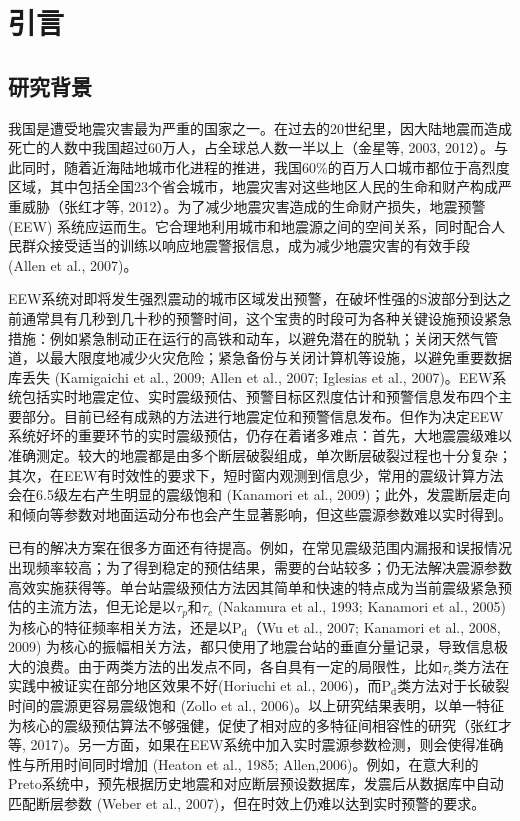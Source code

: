 
\chapter{引言}
\section{研究背景}
\indent 我国是遭受地震灾害最为严重的国家之一。在过去的20世纪里，因大陆地震而造成死亡的人数中我国超过60万人，占全球总人数一半以上（金星等, 2003, 2012）。与此同时，随着近海陆地城市化进程的推进，我国60\%的百万人口城市都位于高烈度区域，其中包括全国23个省会城市，地震灾害对这些地区人民的生命和财产构成严重威胁（张红才等, 2012）。为了减少地震灾害造成的生命财产损失，地震预警 (EEW) 系统应运而生。它合理地利用城市和地震源之间的空间关系，同时配合人民群众接受适当的训练以响应地震警报信息，成为减少地震灾害的有效手段 (Allen et al., 2007)。


 \indent EEW系统对即将发生强烈震动的城市区域发出预警，在破坏性强的S波部分到达之前通常具有几秒到几十秒的预警时间，这个宝贵的时段可为各种关键设施预设紧急措施：例如紧急制动正在运行的高铁和动车，以避免潜在的脱轨；关闭天然气管道，以最大限度地减少火灾危险；紧急备份与关闭计算机等设施，以避免重要数据库丢失 (Kamigaichi et al., 2009; Allen et al., 2007; Iglesias et al., 2007)。EEW系统包括实时地震定位、实时震级预估、预警目标区烈度估计和预警信息发布四个主要部分。目前已经有成熟的方法进行地震定位和预警信息发布。但作为决定EEW系统好坏的重要环节的实时震级预估，仍存在着诸多难点：首先，大地震震级难以准确测定。较大的地震都是由多个断层破裂组成，单次断层破裂过程也十分复杂；其次，在EEW有时效性的要求下，短时窗内观测到信息少，常用的震级计算方法会在6.5级左右产生明显的震级饱和 (Kanamori et al., 2009)；此外，发震断层走向和倾向等参数对地面运动分布也会产生显著影响，但这些震源参数难以实时得到。
 
 \indent 已有的解决方案在很多方面还有待提高。例如，在常见震级范围内漏报和误报情况出现频率较高；为了得到稳定的预估结果，需要的台站较多；仍无法解决震源参数高效实施获得等。单台站震级预估方法因其简单和快速的特点成为当前震级紧急预估的主流方法，但无论是以$\tau_{p}$和$\tau_{c}$ (Nakamura et al., 1993; Kanamori et al., 2005) 为核心的特征频率相关方法，还是以$\mathrm{P}_{\mathrm{d}}$（Wu et al., 2007; Kanamori et al., 2008, 2009) 为核心的振幅相关方法，都只使用了地震台站的垂直分量记录，导致信息极大的浪费。由于两类方法的出发点不同，各自具有一定的局限性，比如$\tau_{c}$类方法在实践中被证实在部分地区效果不好(Horiuchi et al., 2006)，而$\mathrm{P}_{\mathrm{d}}$类方法对于长破裂时间的震源更容易震级饱和 (Zollo et al., 2006)。以上研究结果表明，以单一特征为核心的震级预估算法不够强健，促使了相对应的多特征间相容性的研究（张红才等, 2017)。另一方面，如果在EEW系统中加入实时震源参数检测，则会使得准确性与所用时间同时增加 (Heaton et al., 1985; Allen,2006)。例如，在意大利的Preto系统中，预先根据历史地震和对应断层预设数据库，发震后从数据库中自动匹配断层参数 (Weber et al., 2007)，但在时效上仍难以达到实时预警的要求。


